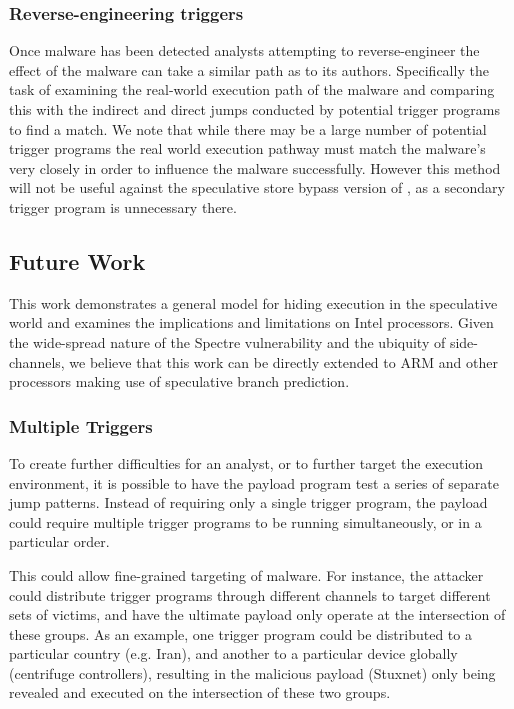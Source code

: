 \subsubsection{Reverse-engineering triggers}
Once \speculake malware has been detected analysts attempting to
reverse-engineer the effect of the malware can take a similar path as to its
authors. Specifically the task of examining the real-world execution path of the
malware and comparing this with the indirect and direct jumps conducted by
potential trigger programs to find a match. We note that while there may be a
large number of potential trigger programs the real world execution pathway must
match the malware's very closely in order to influence the malware successfully.
However this method will not be useful against the speculative store bypass
version of \speculake, as a secondary trigger program is unnecessary there.

\subsection{Future Work}
\label{subsec:future-work}

This work demonstrates a general model for hiding execution in 
the speculative world and examines the implications and limitations on 
Intel processors. Given the wide-spread nature of the Spectre vulnerability 
and the ubiquity of side-channels, we believe that this work can 
be directly extended to ARM and other processors making use of
speculative branch prediction.

\subsubsection{Multiple Triggers}
To create further difficulties for an analyst, or to further target the
execution environment, it is possible to have the payload program test a series
of separate jump patterns. Instead of requiring only a single trigger program,
the payload could require multiple trigger programs to be running
simultaneously, or in a particular order.

This could allow fine-grained targeting of malware. For instance, the attacker
could distribute trigger programs through different channels to target different sets
of victims, and have the ultimate payload only operate at the intersection of
these groups. As an example, one trigger program could be distributed to a
particular country (e.g. Iran), and another to a particular device globally
(centrifuge controllers), resulting in the malicious payload (Stuxnet) only
being revealed and executed on the intersection of these two groups.


